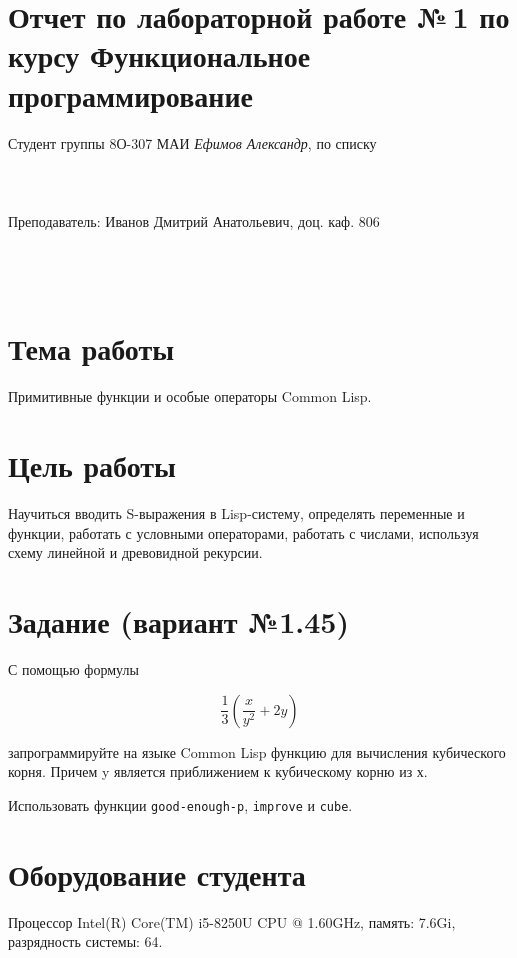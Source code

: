 \documentclass[12pt]{article}
\begin{document}
\section*{Отчет по лабораторной работе №\,1 
по курсу \guillemotleft  Функциональное программирование\guillemotright}
\begin{flushright}
Студент группы 8О-307 МАИ \textit{Ефимов Александр},  по списку \\
 \\
 \\
\ \\
Преподаватель: Иванов Дмитрий Анатольевич, доц. каф. 806 \\
 \\
 \\
 \\

\end{flushright}

\section{Тема работы}
Примитивные функции и особые операторы Common Lisp.

\section{Цель работы}
Научиться вводить S-выражения в Lisp-систему, определять переменные и функции, работать с условными
операторами, работать с числами, используя схему линейной и древовидной рекурсии.

\section{Задание (вариант №1.45)}
С помощью формулы

$$
\frac{1}{3} \left(\frac{x}{y^2} + 2y\right) 
$$

запрограммируйте на языке Common Lisp функцию для вычисления кубического корня. Причем y является
приближением к кубическому корню из х.

Использовать функции {\tt good-enough-p}, {\tt improve} и {\tt cube}.

\section{Оборудование студента}
Процессор Intel(R) Core(TM) i5-8250U CPU @ 1.60GHz, память: 7.6Gi, разрядность системы: 64.
\end{document}
